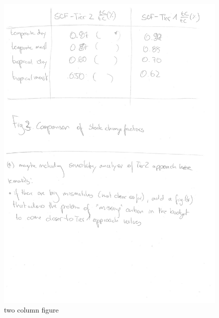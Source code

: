 \documentclass[gc, manuscript]{copernicus}
\begin{document}
\begin{figure}
\includegraphics[width=12cm]{images/figs_draft-2} \caption{two column figure}\label{fig:unnamed-chunk-7}
\end{figure}
\end{document}
